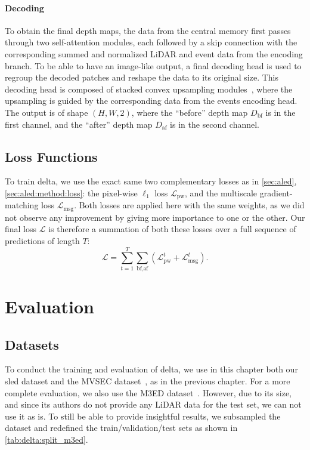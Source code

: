 \paragraph{Decoding}
To obtain the final depth maps, the data from the central memory first passes through two self-attention modules, each followed by a skip connection with the corresponding summed and normalized LiDAR and event data from the encoding branch. To be able to have an image-like output, a final decoding head is used to regroup the decoded patches and reshape the data to its original size. This decoding head is composed of stacked convex upsampling modules~\cite{Teed2020RAFTRA}, where the upsampling is guided by the corresponding data from the events encoding head. The output is of shape \((H, W, 2)\), where the ``before'' depth map \(D_\text{bf}\) is in the first channel, and the ``after'' depth map \(D_\text{af}\) is in the second channel. 

\subsection{Loss Functions}
To train \acrshort{delta}, we use the exact same two complementary losses as in \cref{sec:aled}, \cref{sec:aled:method:loss}: the pixel-wise \(\ell_1\) loss \(\mathcal{L}_\text{pw}\), and the multiscale gradient-matching loss \(\mathcal{L}_\text{msg}\). Both losses are applied here with the same weights, as we did not observe any improvement by giving more importance to one or the other. Our final loss \(\mathcal{L}\) is therefore a summation of both these losses over a full sequence of predictions of length \(T\):
\begin{equation}
  \mathcal{L} = \sum_{t=1}^T \sum_{\text{bf}, \text{af}} (\mathcal{L}_\text{pw}^t + \mathcal{L}_{\text{msg}}^t).
\end{equation}


\section{Evaluation}\label{sec:delta:eval}

\subsection{Datasets}
To conduct the training and evaluation of \acrshort{delta}, we use in this chapter both our \acrshort{sled} dataset and the MVSEC dataset~\cite{Zhu2018TheMS}, as in the previous chapter. For a more complete evaluation, we also use the M3ED dataset~\cite{Chaney2023M3EDMM}. However, due to its size, and since its authors do not provide any LiDAR data for the test set, we can not use it as is. To still be able to provide insightful results, we subsampled the dataset and redefined the train/validation/test sets as shown in \cref{tab:delta:split_m3ed}.

